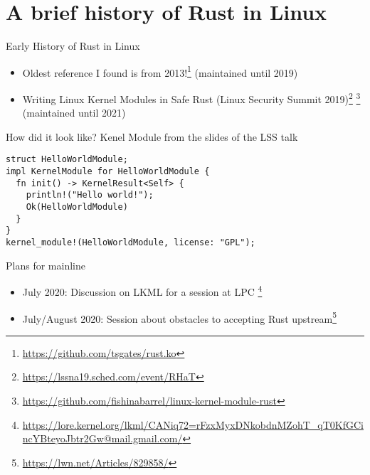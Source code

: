 \section{A brief history of Rust in Linux}

\begin{frame}[c]{Early History of Rust in Linux}
 \begin{itemize}
   \item Oldest reference I found is from 2013!\footnote{\url{https://github.com/tsgates/rust.ko}}
     {\small (maintained until 2019)}
   \pause \item Writing Linux Kernel Modules in Safe Rust (Linux Security Summit 2019)\footnote<2->{\url{https://lssna19.sched.com/event/RHaT}}
     \footnote<2->{\url{https://github.com/fishinabarrel/linux-kernel-module-rust}}
     {\small (maintained until 2021)}
 \end{itemize}
\end{frame}

\begin{frame}[c,fragile]{How did it look like?}
  Kenel Module from the slides of the LSS talk
  \begin{verbatim}
struct HelloWorldModule;
impl KernelModule for HelloWorldModule {
  fn init() -> KernelResult<Self> {
    println!("Hello world!");
    Ok(HelloWorldModule)
  }
}
kernel_module!(HelloWorldModule, license: "GPL");
  \end{verbatim}
\end{frame}

\begin{frame}[c]{Plans for mainline}
  \begin{itemize}
    \item July 2020: Discussion on LKML for a session at LPC
      \footnote{\url{https://lore.kernel.org/lkml/CANiq72=rFzxMyxDNkobdnMZohT_qT0KfGCincYBteyoJbtr2Gw@mail.gmail.com/}}
    \item July/August 2020: Session about obstacles to accepting Rust
      upstream\footnote{\url{https://lwn.net/Articles/829858/}}
  \end{itemize}
\end{frame}

